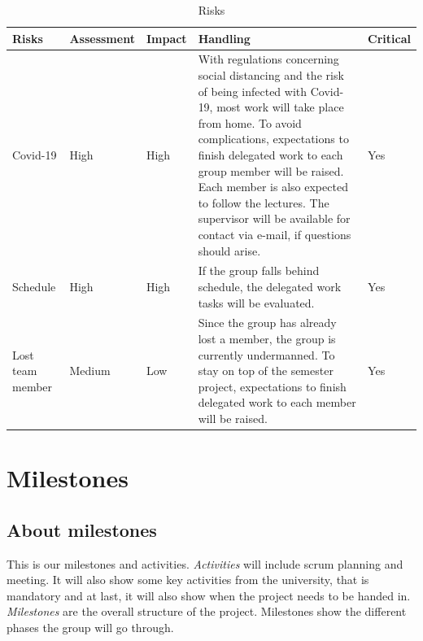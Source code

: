 \begin{table}[ht]
    \begin{tabularx}{\textwidth}{|>{\RaggedRight}p{1.7cm}|>{\RaggedRight}p{2.2cm}|>{\RaggedRight}p{1.4cm}|>{\RaggedRight}X|>{\RaggedRight}p{1.6cm}|}
        \hline
        \textbf{Risks} & \textbf{Assessment} & \textbf{Impact} & \textbf{Handling} & \textbf{Critical} \\
        \hline
        Covid-19 & High & High & 
        With regulations concerning social distancing and the risk of being infected
        with Covid-19, most work will take place from home. To avoid complications,
        expectations to finish delegated work to each group member will be raised. Each
        member is also expected to follow the lectures. The supervisor will be available
        for contact via e-mail, if questions should arise.
                 & Yes \\
                 \hline
        Schedule & High & High &
        If the group falls behind schedule, the delegated work tasks will be evaluated.
                 & Yes \\
                 \hline
        Lost team member        & Medium & Low & 
        Since the group has already lost a member, the group is currently undermanned.
        To stay on top of the semester project, expectations to finish delegated work to
        each member will be raised.
                                & Yes \\
                                \hline
    \end{tabularx}
    \caption{Risks} 
    \label{table:Risks}
\end{table} 


\section{Milestones}

\subsection{About milestones}
This is our milestones and activities.
\textit{Activities} will include scrum planning and meeting.
It will also show some key activities from the university, that is mandatory
and at last, it will also show when the project needs to be handed in.
\textit{Milestones} are the overall structure of the project.
Milestones show the different phases the group will go through.

